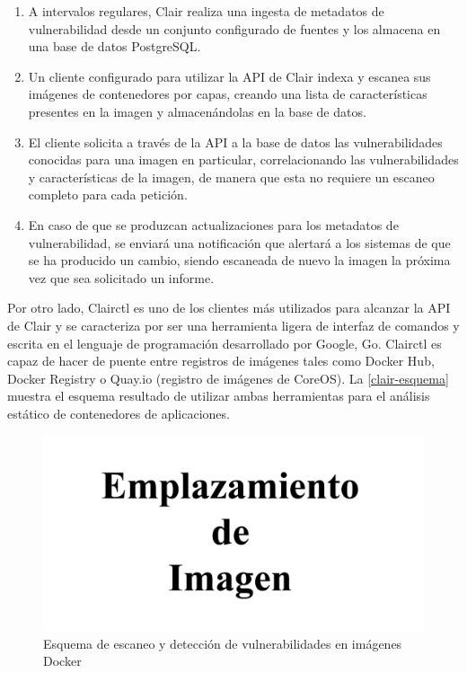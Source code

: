 \begin{enumerate}
	\item A intervalos regulares, Clair realiza una ingesta de metadatos de vulnerabilidad desde un conjunto configurado de fuentes  y los almacena en una base de datos PostgreSQL.
	\item Un cliente configurado para utilizar la \gls{API} de Clair indexa y escanea sus imágenes de contenedores por capas, creando una lista de características presentes en la imagen y almacenándolas en la base de datos.
	\item El cliente solicita a través de la \gls{API} a la base de datos las vulnerabilidades conocidas para una imagen en particular, correlacionando las vulnerabilidades y características de la imagen, de manera que esta no requiere un escaneo completo para cada petición.
	\item En caso de que se produzcan actualizaciones para los metadatos de vulnerabilidad, se enviará una notificación que alertará a los sistemas de que se ha producido un cambio, siendo escaneada de nuevo la imagen la próxima vez que sea solicitado un informe.
\end{enumerate}

Por otro lado, Clairctl es uno de los clientes más utilizados para alcanzar la \gls{API} de Clair y se caracteriza por ser una herramienta ligera de interfaz de comandos y escrita en el lenguaje de programación desarrollado por Google, Go. Clairctl es capaz de hacer de puente entre registros de imágenes tales como Docker Hub, Docker Registry o Quay.io (registro de imágenes de CoreOS). La \autoref{clair-esquema} muestra el esquema resultado de utilizar ambas herramientas para el análisis estático de contenedores de aplicaciones.

\begin{figure}[htbp]
	\centering
	\includegraphics[width=0.80\linewidth]
	{figuras/emplazamiento-imagen.png}
	\caption{Esquema de escaneo y detección de vulnerabilidades en imágenes Docker}
	\label{clair-esquema}
\end{figure}


